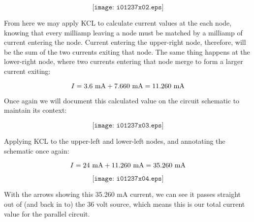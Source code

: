 $$\texttt{[image: i01237x02.eps]}$$

\filbreak

From here we may apply KCL to calculate current values at the each node, knowing that every milliamp leaving a node must be matched by a milliamp of current entering the node.  Current entering the upper-right node, therefore, will be the sum of the two currents exiting that node.  The same thing happens at the lower-right node, where two currents entering that node merge to form a larger current exiting:

$$I = 3.6 \hbox{ mA} + 7.660 \hbox{ mA} = 11.260 \hbox{ mA}$$

Once again we will document this calculated value on the circuit schematic to maintain its context:

$$\texttt{[image: i01237x03.eps]}$$

Applying KCL to the upper-left and lower-left nodes, and annotating the schematic once again:

$$I = 24 \hbox{ mA} + 11.260 \hbox{ mA} = 35.260 \hbox{ mA}$$

$$\texttt{[image: i01237x04.eps]}$$

With the arrows showing this 35.260 mA current, we can see it passes straight out of (and back in to) the 36 volt source, which means this is our total current value for the parallel circuit.










